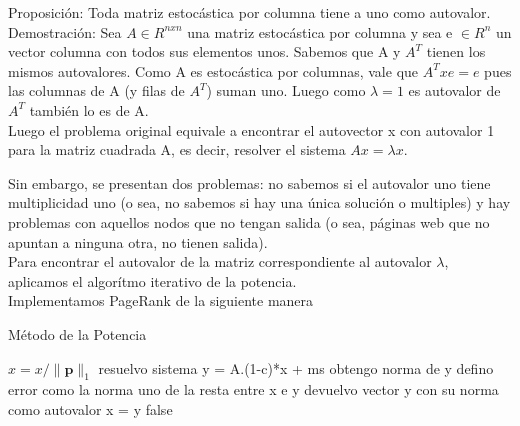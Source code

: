 Proposición: Toda matriz estocástica por columna tiene a uno como autovalor.
Demostración: Sea $A \in R^{nxn}$ una matriz estocástica por columna y sea e $\in R^{n}$ un vector columna con todos sus elementos unos. Sabemos que A y $A^{T}$ tienen los mismos autovalores.
Como A es estocástica por columnas, vale que $A^{T} x e = e$ pues las columnas de A (y filas de $A^{T}$) suman uno. Luego como $\lambda = 1$ es autovalor de $A^{T}$ también lo es de A. \\

Luego el problema original equivale a encontrar el autovector x con autovalor 1 para la matriz cuadrada A, es decir, resolver el sistema $Ax = \lambda x$.

Sin embargo, se presentan dos problemas: no sabemos si el autovalor uno tiene multiplicidad uno (o sea, no sabemos si hay una única solución o multiples) y  hay problemas con aquellos nodos que no tengan salida (o sea, páginas web que no apuntan a ninguna otra, no tienen salida).\\



Para encontrar el autovalor de la matriz correspondiente al autovalor $\lambda$, aplicamos el algorítmo iterativo de la potencia.\\

Implementamos PageRank de la siguiente manera


\begin{algorithm}
\caption{Método de la Potencia}\label{metpot}
\begin{algorithmic}[1]


    \State $x = x/\lVert \mathbf{p} \rVert _{1}$
	    \State resuelvo sistema y = A.(1-c)*x + ms
 	    \State obtengo norma de y
 	    \State 	defino error como la norma uno de la resta entre x e y
      	\State devuelvo vector y con su norma como autovalor
      \Else
        \State x = y
      \EndIf
    \EndWhile
    \Return false
  \EndFunction

\end{algorithmic}
\end{algorithm}
